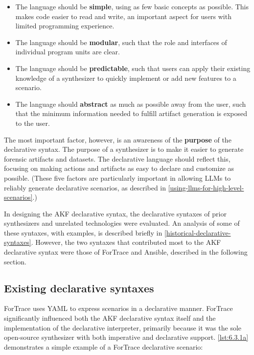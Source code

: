 \documentclass[letterpaper,12pt]{report}
\def\tightlist{}
\begin{document}
\begin{itemize}
\tightlist
\item
  The language should be \textbf{simple}, using as few basic concepts as
  possible. This makes code easier to read and write, an important
  aspect for users with limited programming experience.
\item
  The language should be \textbf{modular}, such that the role and
  interfaces of individual program units are clear.
\item
  The language should be \textbf{predictable}, such that users can apply
  their existing knowledge of a synthesizer to quickly implement or add
  new features to a scenario.
\item
  The language should \textbf{abstract} as much as possible away from
  the user, such that the minimum information needed to fulfill artifact
  generation is exposed to the user.
\end{itemize}

The most important factor, however, is an awareness of the
\textbf{purpose} of the declarative syntax. The purpose of a synthesizer
is to make it easier to generate forensic artifacts and datasets. The
declarative language should reflect this, focusing on making actions and
artifacts as easy to declare and customize as possible. (These five
factors are particularly important in allowing LLMs to reliably generate
declarative scenarios, as described in \autoref{using-llms-for-high-level-scenarios}.)

In designing the AKF declarative syntax, the declarative syntaxes of
prior synthesizers and unrelated technologies were evaluated. An
analysis of some of these syntaxes, with examples, is described briefly
in \autoref{historical-declarative-syntaxes}.
However, the two syntaxes that contributed most to the AKF declarative
syntax were those of ForTrace and Ansible, described in the following
section.

\subsection{Existing declarative
syntaxes}\label{existing-declarative-syntaxes}

ForTrace \cite{gobelForTraceHolisticForensic2022} uses YAML to
express scenarios in a declarative manner. ForTrace significantly
influenced both the AKF declarative syntax itself and the implementation
of the declarative interpreter, primarily because it was the sole
open-source synthesizer with both imperative and declarative support.
\autoref{lst:6.3.1a} demonstrates a simple example of a ForTrace
declarative scenario:
\end{document}

